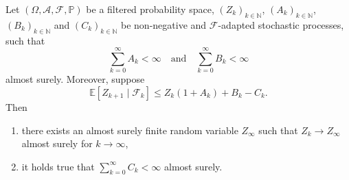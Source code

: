 \documentclass[12pt,openany]{book}
\theoremstyle{definition}
\theoremstyle{definition}
\newcommand{\E}{\mathbb{E}}
\newcommand{\N}{\mathbb{N}}
\begin{document}
\begin{thm}\label{thm:RS}
Let $(\Omega,\mathcal A,\mathcal F,\mathbb P)$ be a filtered probability space, $(Z_k)_{k\in\N}$, $(A_k)_{k\in\N}$, $(B_k)_{k\in\N}$ and $(C_k)_{k\in\N}$ be non-negative and $\mathcal F$-adapted stochastic processes, such that
\[\sum_{k=0}^\infty A_k<\infty \quad \text{and}\quad \sum_{k=0}^\infty B_k<\infty\]
almost surely. Moreover, suppose
\begin{equation} \label{eq:RS_recursion}
\E[Z_{k+1}\mid \mathcal F_k] \le Z_k (1+A_k) + B_k - C_k.
\end{equation}
Then 
\begin{enumerate}
\item there exists an almost surely finite random variable $Z_\infty$ such that $Z_k\to Z_\infty$ almost surely for $k\to\infty$,
\item it holds true that $\sum_{k=0}^\infty C_k<\infty$ almost surely. 
\end{enumerate}
\end{thm}
\end{document}
